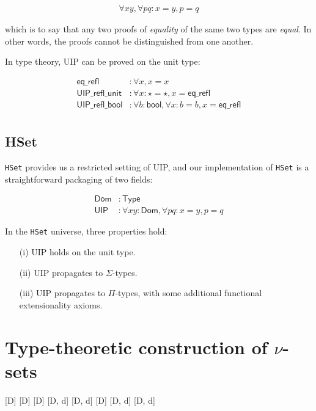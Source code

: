 \documentclass[10pt]{art.cls/art}
\newcommand{\unitpoint}{\star}
\begin{document}
\begin{align*}
  \forall x y, \forall p q : x = y, p = q
\end{align*}

which is to say that any two proofs of \emph{equality} of the same two types are \emph{equal}. In other words, the proofs cannot be distinguished from one another.

In type theory, UIP can be proved on the unit type:

\begin{align*}
  \mathsf{eq\_refl}        & : \forall x, x = x                                                    \\
  \mathsf{UIP\_refl\_unit} & : \forall x : \unitpoint = \unitpoint, x = \mathsf{eq\_refl}          \\
  \mathsf{UIP\_refl\_bool} & : \forall b : \mathsf{bool}, \forall x : b = b, x = \mathsf{eq\_refl} \\
\end{align*}

\subsection{HSet}
\texttt{HSet} provides us a restricted setting of UIP, and our implementation of \texttt{HSet} is a straightforward packaging of two fields:

\begin{align*}
  \mathsf{Dom} & : \mathsf{Type}                                          \\
  \mathsf{UIP} & : \forall x y : \mathsf{Dom}, \forall p q : x = y, p = q
\end{align*}

In the \texttt{HSet} universe, three properties hold:

\begin{enumerate}
  \item[(i)] UIP holds on the unit type.
  \item[(ii)] UIP propagates to $\Sigma$-types.
  \item[(iii)] UIP propagates to $\Pi$-types, with some additional functional extensionality axioms.
\end{enumerate}

\section{Type-theoretic construction of \texorpdfstring{$\nu$}{nu}-sets}
%
[D]
[D]
[D]
[D, d]
[D, d]
[D]
[D, d]
[D, d]
\end{document}
